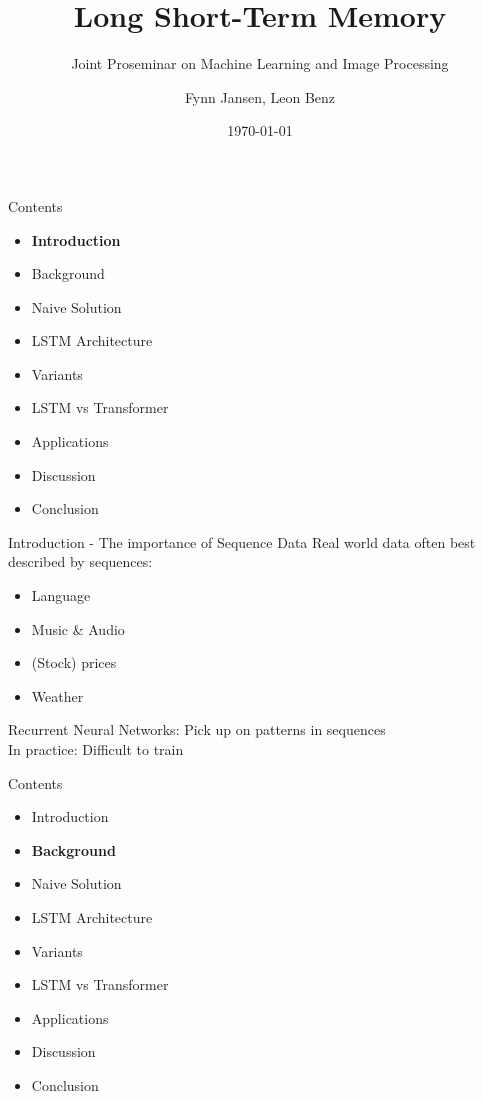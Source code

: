 \documentclass[10pt, aspectratio=169]{beamer}
\title{Long Short-Term Memory}
\subtitle{Joint Proseminar on Machine Learning and Image Processing}
\date{\today}
\author{Fynn Jansen, Leon Benz}
\institute{Chair of Computer Science 13 (Computer Vision)\\RWTH Aachen}
\begin{document}
\maketitle


\begin{frame}[t]{Contents}
\begin{itemize}
    \item \textbf{Introduction}
    \item Background
    \item Naive Solution
    \item LSTM Architecture
    \item Variants
    \item LSTM vs Transformer
    \item Applications
    \item Discussion
    \item Conclusion
\end{itemize}
\end{frame}

\begin{frame}[t]{Introduction - The importance of Sequence Data}
Real world data often best described by sequences: \pause
\begin{itemize}
    \item Language \pause
    \item Music \& Audio \pause
    \item (Stock) prices \pause
    \item Weather \pause
\end{itemize}
Recurrent Neural Networks: Pick up on patterns in sequences\pause \\
In practice: Difficult to train 
\end{frame}

\begin{frame}[t]{Contents}
\begin{itemize}
    \item Introduction
    \item \textbf{Background}
    \item Naive Solution
    \item LSTM Architecture
    \item Variants
    \item LSTM vs Transformer
    \item Applications
    \item Discussion
    \item Conclusion
\end{itemize}
\end{frame}
\end{document}
